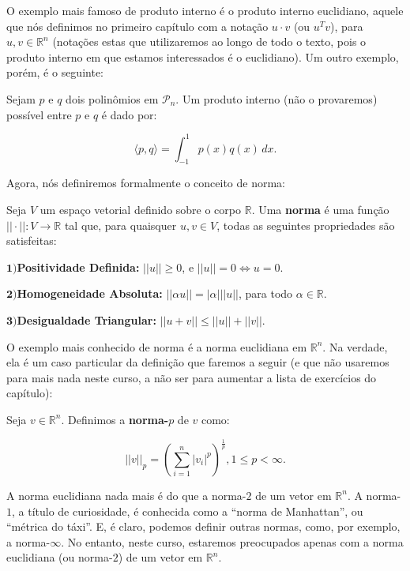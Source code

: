 O exemplo mais famoso de produto interno é o produto interno euclidiano, aquele que nós definimos no primeiro capítulo com a notação $u\cdot v$ (ou $u^Tv$), para $u,v\in\mathbb{R}^n$ (notações estas que utilizaremos ao longo de todo o texto, pois o produto interno em que estamos interessados é o euclidiano). Um outro exemplo, porém, é o seguinte:

\begin{Example}
	Sejam $p$ e $q$ dois polinômios em $\mathcal{P}_n$. Um produto interno (não o provaremos) possível entre $p$ e $q$ é dado por:
	
	$$
	\langle p, q\rangle = \displaystyle\int_{-1}^{1} p(x)q(x)  \,dx.	
	$$
\end{Example}

Agora, nós definiremos formalmente o conceito de norma:

\begin{Definition}[Norma]
	Seja $V$ um espaço vetorial definido sobre o corpo $\mathbb{R}$. Uma \textbf{norma} é uma função $||\cdot||:V\to\mathbb{R}$ tal que, para quaisquer $u, v\in V$, todas as seguintes propriedades são satisfeitas:
	
	$\mathbf{1)}$\textbf{Positividade Definida:} $||u||\geq 0$, e $||u|| = 0\iff u = 0$.
	
	$\mathbf{2)}$\textbf{Homogeneidade Absoluta:} $||\alpha u|| = |\alpha|||u||$, para todo $\alpha\in\mathbb{R}$.
	
	$\mathbf{3)}$\textbf{Desigualdade Triangular:} $||u + v||\leq||u|| + ||v||$.
\end{Definition}

O exemplo mais conhecido de norma é a norma euclidiana em $\mathbb{R}^n$. Na verdade, ela é um caso particular da definição que faremos a seguir (e que não usaremos para mais nada neste curso, a não ser para aumentar a lista de exercícios do capítulo):

\begin{Definition}[Norma-$p$]
	Seja $v\in\mathbb{R}^n$. Definimos a \textbf{norma-$p$} de $v$ como:
	
	$$
	||v||_p = \left(\sum\limits_{i = 1}^{n} |v_i|^p\right)^{\frac{1}{p}}, 1\leq p <\infty.
	$$
\end{Definition}

A norma euclidiana nada mais é do que a norma-$2$ de um vetor em $\mathbb{R}^n$. A norma-$1$, a título de curiosidade, é conhecida como a ``norma de Manhattan'', ou ``métrica do táxi''. E, é claro, podemos definir outras normas, como, por exemplo, a norma-$\infty$. No entanto, neste curso, estaremos preocupados apenas com a norma euclidiana (ou norma-$2$) de um vetor em $\mathbb{R}^n$.

